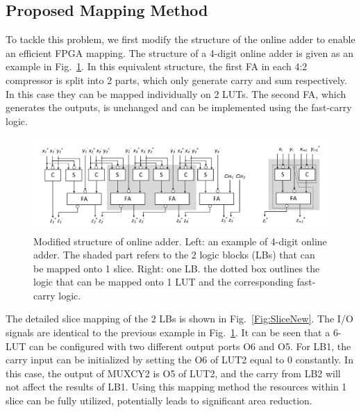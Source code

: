 \documentclass[conference]{IEEEtran}
\begin{document}
\subsection{Proposed Mapping Method}
To tackle this problem, we first modify the structure of the online adder to enable an efficient FPGA mapping. The structure of a 4-digit online adder is given as an example in Fig.~\ref{Fig:ModifiedOA}. In this equivalent structure, the first FA in each 4:2 compressor is split into 2 parts, which only generate carry and sum respectively. In this case they can be mapped individually on 2 LUTs. The second FA, which generates the outputs, is unchanged and can be implemented using the fast-carry logic.



\begin{figure}[tbp]
	\centering
	\includegraphics[width=.85\textwidth]{./Figures/SDadder_FPGA_New_4digit.pdf}
	\caption{Modified structure of online adder. Left: an example of 4-digit online adder. The shaded part refers to the 2 logic blocks (LBs) that can be mapped onto 1 slice. Right: one LB. the dotted box outlines the logic that can be mapped onto 1 LUT and the corresponding fast-carry logic.}
	\label{Fig:ModifiedOA}
\end{figure}

The detailed slice mapping of the 2 LBs is shown in Fig.~\ref{Fig:SliceNew}. The I/O signals are identical to the previous example in Fig.~\ref{Fig:ModifiedOA}. It can be seen that a 6-LUT can be configured with two different output ports O6 and O5. For LB1, the carry input can be initialized by setting the O6 of LUT2 equal to 0 constantly. In this case, the output of MUXCY2 is O5 of LUT2, and the carry from LB2 will not affect the results of LB1. Using this mapping method the resources within 1 slice can be fully utilized, potentially leads to significant area reduction.
\end{document}
